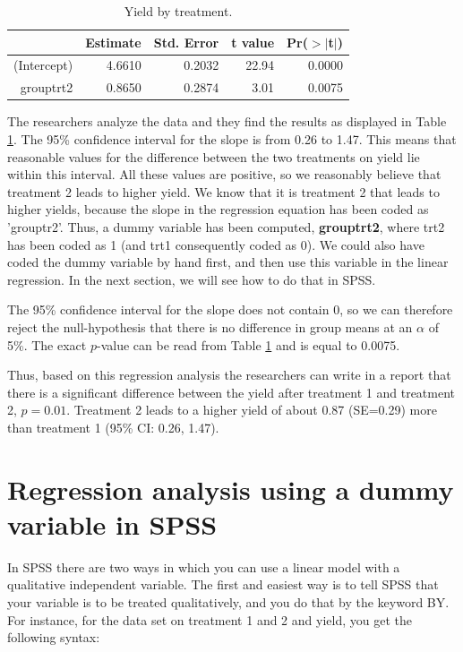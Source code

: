 \documentclass[]{report}\usepackage[]{graphicx}\usepackage[]{color}
\begin{document}
\begin{table}[ht]
\centering
\caption{Yield by treatment.} 
\label{tab:dummy_9}
\begin{tabular}{rrrrr}
  \hline
 & Estimate & Std. Error & t value & Pr($>$$|$t$|$) \\ 
  \hline
(Intercept) & 4.6610 & 0.2032 & 22.94 & 0.0000 \\ 
  grouptrt2 & 0.8650 & 0.2874 & 3.01 & 0.0075 \\ 
   \hline
\end{tabular}
\end{table}


The researchers analyze the data and they find the results as displayed in Table \ref{tab:dummy_9}. The 95\% confidence interval for the slope is from 0.26 to 1.47. This means that reasonable values for the difference between the two treatments on yield lie within this interval. All these values are positive, so we reasonably believe that treatment 2 leads to higher yield. We know that it is treatment 2 that leads to higher yields, because the slope in the regression equation has been coded as 'grouptr2'. Thus, a dummy variable has been computed, \textbf{grouptrt2}, where trt2 has been coded as 1 (and trt1 consequently coded as 0). We could also have coded the dummy variable by hand first, and then use this variable in the linear regression. In the next section, we will see how to do that in SPSS.

The 95\% confidence interval for the slope does not contain 0, so we can therefore reject the null-hypothesis that there is no difference in group means at an $\alpha$ of 5\%. The exact $p$-value can be read from Table \ref{tab:dummy_9} and is equal to 0.0075.

Thus, based on this regression analysis the researchers can write in a report that there is a significant difference between the yield after treatment 1 and treatment 2, $p=0.01$. Treatment 2 leads to a higher yield of about 0.87 (SE=0.29) more than treatment 1 (95\% CI: 0.26, 1.47).

\section{Regression analysis using a dummy variable in SPSS}

In SPSS there are two ways in which you can use a linear model with a qualitative independent variable. The first and easiest way is to tell SPSS that your variable is to be treated qualitatively, and you do that by the keyword BY. For instance, for the data set on treatment 1 and 2 and yield, you get the following syntax:
\end{document}
